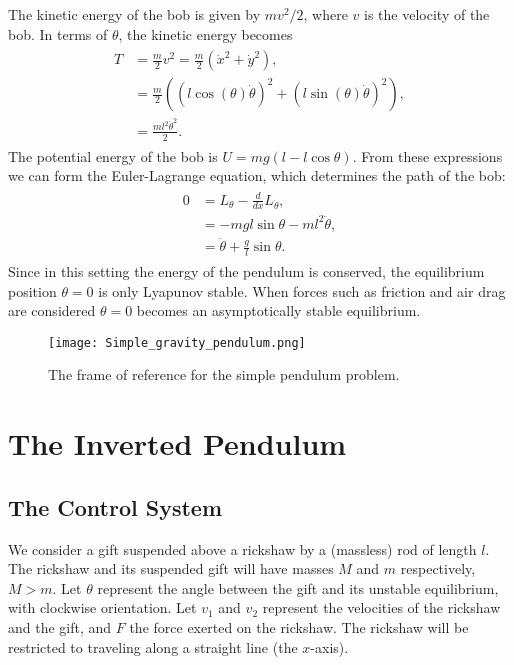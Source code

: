 The kinetic energy of the bob is given by $mv^2/2$, where $v$ is the velocity of the bob. 
In terms of $\theta$, the kinetic energy becomes 
\begin{align}
	\begin{split}
	T &= \frac{m}{2}v^2  = \frac{m}{2}(\dot{x}^2 + \dot{y}^2),\\
	&= \frac{m}{2}((l\cos(\theta)\dot{\theta})^2 + (l\sin(\theta)\dot{\theta})^2),\\
	&= \frac{ml^2\dot{\theta}^2}{2}.
	\end{split}
\end{align}
The potential energy of the bob is $U = mg(l-l\cos \theta)$. 
From these expressions we can form the Euler-Lagrange equation, which determines the path of the bob: 
\begin{align}
	\begin{split}
	0 &= L_{\theta} - \frac{d}{dx}L_{\dot{\theta}},\\
	&= -mgl\sin \theta - m l^2 \ddot{\theta},\\
	&= \ddot{\theta} + \frac{g}{l}\sin \theta.
	\end{split}
\end{align}
Since in this setting the energy of the pendulum is conserved, the equilibrium position $\theta = 0$ is only Lyapunov stable. When forces such as friction and air drag are considered $\theta = 0$ becomes an asymptotically stable equilibrium. 

\begin{figure}
\centering
\texttt{[image: Simple\_gravity\_pendulum.png]}
\caption{The frame of reference for the simple pendulum problem.
}
\label{fig:inverted_pendulum:simple_gravity_pendulum}
\end{figure}

\section*{The Inverted Pendulum}
\subsection*{The Control System}
We consider a gift suspended above a rickshaw by a (massless) rod of length $l$. 
The rickshaw and its suspended gift will have masses $M$ and $m$ respectively, $M > m$.  
Let $\theta $ represent the angle between the gift and its unstable equilibrium, with clockwise orientation. 
Let $v_1$ and $v_2$ represent the velocities of the rickshaw and the gift, and $F$ the force exerted on the rickshaw. 
The rickshaw will be restricted to traveling along a straight line (the $x$-axis). 

